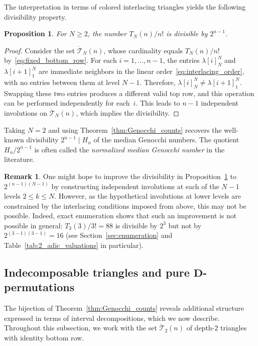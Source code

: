 \documentclass[10pt,a4paper]{amsart}
\numberwithin{equation}{section}
\newtheorem{Proposition}[Theorem]{Proposition}
\theoremstyle{definition}
\newtheorem{Remark}[Theorem]{Remark}
\begin{document}
The interpretation in terms of colored interlacing triangles
  yields the following divisibility property.

\begin{Proposition}\label{Prop2.3}
For $N\ge2$, the number $T_N(n)/n!$ is
  divisible by $2^{n-1}$.
\end{Proposition}

\begin{proof} Consider the set $\mathring{\mathcal{T}}_N(n)$, whose
  cardinality equals $T_N(n)/n!$ by~\eqref{eq:fixed_bottom_row}. For each
  $i=1,\ldots,n-1$, the entries $\lambda[i]^N_N$ and
  $\lambda[i+1]^N_1$ are immediate neighbors in the linear order~\eqref{eq:interlacing_order}, with no entries between them at level $N-1$. Therefore,
  $\lambda[i]^N_N \ne \lambda[i+1]^N_1$. Swapping these two
  entries produces a different valid top row, and this operation
  can be performed independently for each~$i$. This leads to
  $n-1$ independent involutions on $\mathring{\mathcal{T}}_N(n)$,
  which implies the divisibility.
\end{proof}

  Taking $N=2$ and using Theorem~\ref{thm:Genocchi_counts} recovers the well-known
  divisibility $2^{n-1} \mid H_n$ of the median Genocchi numbers.
  The quotient~$H_n/2^{n-1}$ is often called the \emph{normalized
  median Genocchi number} in the literature.

\begin{Remark}
	\label{rem:divisibility_no_improvement} One might hope to improve the
	divisibility in Proposition~\ref{Prop2.3} to $2^{(n-1)(N-1)}$
	by constructing independent involutions at each of the $N-1$ levels
	$2\le k \le N$.
	However, as the hypothetical involutions at lower levels are constrained by
	the interlacing conditions imposed from above, this may not be possible.
	Indeed, exact enumeration shows that such an improvement is not possible in
	general: $T_3(3)/3! = 88$ is divisible by $2^3$ but not by
	${2^{(3-1)(3-1)} = 16}$ (see Section~\ref{sec:enumeration} and
	Table~\ref{tab:2_adic_valuations} in particular).
\end{Remark}

\subsection[Indecomposable triangles and pure D-permutations]{Indecomposable triangles and pure $\boldsymbol{D}$-permutations}
\label{subsec:indecomposable_pure}

The bijection of Theorem~\ref{thm:Genocchi_counts} reveals
additional structure expressed in terms of interval
decompositions, which we now describe.  Throughout this
subsection, we work with the set
$\mathring{\mathcal{T}}_2(n)$ of depth-$2$ triangles with
identity bottom row.
\end{document}
